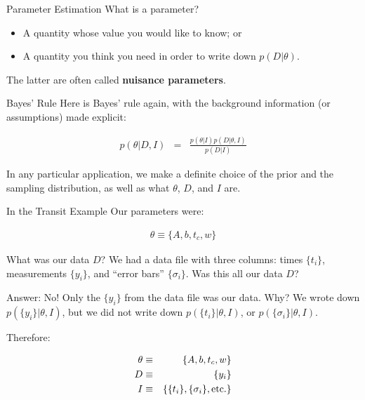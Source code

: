 \begin{frame}[t]{Parameter Estimation}
What is a parameter?

\begin{itemize}
\item A quantity whose value you would like to know; or
\item A quantity you think you need in order to write down
$p(D | \theta)$.
\end{itemize}

The latter are often called {\bf nuisance parameters}.
\end{frame}


\begin{frame}[t]{Bayes' Rule}
Here is Bayes' rule again, with the background information (or assumptions)
made explicit:

\begin{eqnarray*}
p(\theta | D, I) &=& \frac{p(\theta | I)p(D | \theta, I)}{p(D | I)}
\end{eqnarray*}

In any particular application, we make a definite choice of the prior and
the sampling distribution, as well as what $\theta$, $D$, and $I$ are.

\end{frame}


\begin{frame}[t]{In the Transit Example}
Our parameters were:

\begin{eqnarray*}
\theta \equiv \{A, b, t_c, w\}
\end{eqnarray*}

What was our data $D$? We had a data file with three columns: times $\{t_i\}$,
measurements $\{y_i\}$, and ``error bars'' $\{\sigma_i\}$. Was this all our
data $D$?

\end{frame}

\begin{frame}[t]{Answer: No!}
Only the $\{y_i\}$ from the data file was our data. Why? We wrote down
$p(\{y_i\} | \theta, I)$, but we did not write down $p(\{t_i\} | \theta, I)$, or
$p(\{\sigma_i\} | \theta, I)$.

Therefore:

\begin{eqnarray*}
\theta &\equiv& \{A, b, t_c, w\}\\
D &\equiv& \{y_i\}\\
I &\equiv& \{\{t_i\}, \{\sigma_i\}, \textnormal{etc.}\}
\end{eqnarray*}

\end{frame}

